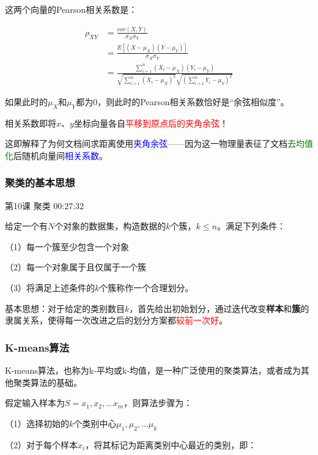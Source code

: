 \documentclass[UTF8]{ctexart}
\begin{document}
这两个向量的Pearson相关系数是：

\begin{equation}
\begin{aligned}
\rho_{XY} &= \frac{cov(X,Y)}{\sigma_{X} \sigma_{Y}} \\
&= \frac{E[(X-\mu_{X})(Y-\mu_{Y})]}{\sigma_{X} \sigma_{Y}}\\
&= \frac{\sum_{i=1}^{n}(X_{i}-\mu_{X})(Y_{i}-\mu_{Y})}{\sqrt{\sum_{i=1}^{n}(X_{i}-\mu_{X})^{2}}\sqrt{(\sum_{i=1}^{n}Y_{i}-\mu_{Y})^{2}}}
\end{aligned}
\end{equation}

如果此时的$\mu_{X}$和$\mu_{Y}$都为0，则此时的Pearson相关系数恰好是“余弦相似度”。

相关系数即将$x$、$y$坐标向量各自\textcolor{red}{平移到原点后的夹角余弦}！

这即解释了为何文档间求距离使用\textcolor{blue}{夹角余弦}——因为这一物理量表征了文档\textcolor{green}{去均值化}后随机向量间\textcolor{blue}{相关系数}。

\subsubsection{聚类的基本思想}

第10课 聚类 00:27:32

给定一个有$N$个对象的数据集，构造数据的$k$个簇，$k \leq n$。满足下列条件：

（1）每一个簇至少包含一个对象

（2）每一个对象属于且仅属于一个簇

（3）将满足上述条件的$k$个簇称作一个合理划分。

基本思想：对于给定的类别数目$k$，首先给出初始划分，通过迭代改变\textbf{样本}和\textbf{簇}的隶属关系，使得每一次改进之后的划分方案都\textcolor{red}{较前一次好}。

\subsubsection{K-means算法}

K-means算法，也称为k-平均或k-均值，是一种广泛使用的聚类算法，或者成为其他聚类算法的基础。

假定输入样本为$S=x_{1},x_{2},...x_{m}$，则算法步骤为：

（1）选择初始的$k$个类别中心$\mu_{1},\mu_{2},...\mu_{k}$

（2）对于每个样本$x_{i}$，将其标记为距离类别中心最近的类别，即：
\end{document}
